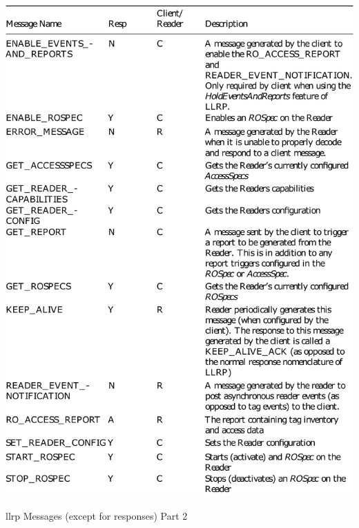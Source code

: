 \begin{appendices}
\begin{table}
    \centering
    \includegraphics[width=\textwidth]{./figs/02-state-of-the-art/table_llrpmessages_2.pdf}
    \caption[\ac{llrp} Messages (except for responses) Part 2]{\ac{llrp} Messages (except for responses) Part 2~\cite{ImpinjLTKProgrammers}} 
    \label{tab:llrpmessages2}
\end{table}

\end{appendices}